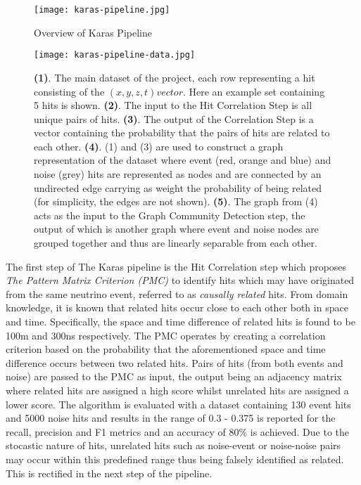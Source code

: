\begin{figure}[h]
  \centering
  \texttt{[image: karas-pipeline.jpg]}
  \caption{Overview of Karas Pipeline}
  \label{fig:karas-pipeline}
\end{figure}

\begin{figure}[h]
  \centering
  \texttt{[image: karas-pipeline-data.jpg]}
  \caption{\textbf{(1)}. The main dataset of the project, each row
    representing a hit consisting of the $(x, y, z, t) vector$. Here
    an example set containing 5 hits is shown. \textbf{(2)}. The input
    to the Hit Correlation Step is all unique pairs of hits.
    \textbf{(3)}. The output of the Correlation Step is a vector
    containing the probability that the pairs of hits are related to
    each other. \textbf{(4)}. (1) and (3) are used to construct a
    graph representation of the dataset where event (red, orange and
    blue) and noise (grey) hits are represented as nodes and are
    connected by an undirected edge carrying as weight the probability
    of being related (for simplicity, the edges are not shown).
    \textbf{(5)}. The graph from (4) acts as the input to the Graph
    Community Detection step, the output of which is another graph
    where event and noise nodes are grouped together and thus are
    linearly separable from each other.}
  \label{fig:karas-pipeline-data}
\end{figure}

The first step of The Karas pipeline is the Hit Correlation step which
proposes \emph{The Pattern Matrix Criterion (PMC)} to identify hits
which may have originated from the same neutrino event, referred to as
\emph{causally related} hits. From domain knowledge, it is known that
related hits occur close to each other both in space and time.
Specifically, the space and time difference of related hits is found
to be 100m and 300ns respectively. The PMC operates by creating a
correlation criterion based on the probability that the aforementioned
space and time difference occurs between two related hits. Pairs of
hits (from both events and noise) are passed to the PMC as input, the
output being an adjacency matrix where related hits are assigned a
high score whilst unrelated hits are assigned a lower score. The
algorithm is evaluated with a dataset containing 130 event hits and
5000 noise hits and results in the range of 0.3 - 0.375 is reported
for the recall, precision and F1 metrics and an accuracy of 80\% is
achieved. Due to the stocastic nature of hits, unrelated hits such as
noise-event or noise-noise pairs may occur within this predefined
range thus being falsely identified as related. This is rectified in
the next step of the pipeline.

